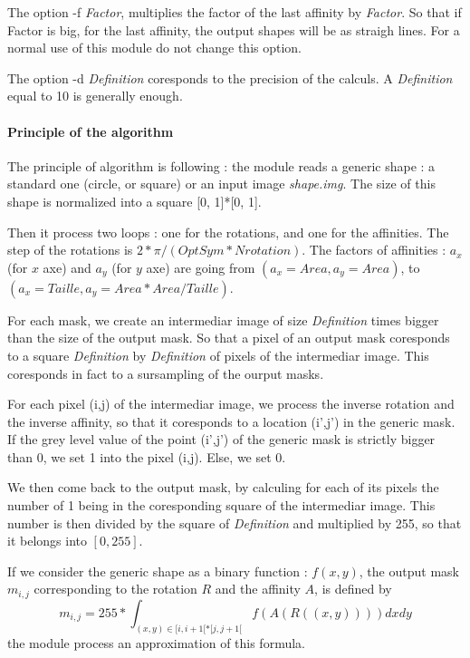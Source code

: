The option -f {\it Factor}, multiplies the factor of the last affinity by {\it Factor}. So that if Factor is big, for the last affinity, the output shapes will be as straigh lines. For a normal use of this module do not change this option.

\vspace{1mm}

The option -d {\it Definition} coresponds to the precision of the calculs.
 A {\it Definition} equal to 10 is generally enough.



\vspace{3mm}

\paragraph{Principle of the algorithm}

The principle of algorithm is following :
the module reads a generic shape : a standard one (circle, or square) or an
input image {\it shape.img}.
The size of this shape is normalized into a square [0, 1]*[0, 1].

Then it process two loops :
one for the rotations, and one for the affinities.
The step of the rotations is $2*\pi/(OptSym*Nrotation)$. The factors of affinities : $a_x$ (for $x$ axe) and $a_y$ (for $y$ axe) are going from
$(a_x = Area, a_y = Area)$, to $(a_x = Taille, a_y= Area*Area/Taille)$.

For each mask, we create an intermediar image of size {\it Definition} times bigger than the size of the output mask.
 So that a pixel of an output mask coresponds to a square {\it Definition} by {\it  Definition} of pixels of the intermediar image. This coresponds in fact to a sursampling of the ourput masks.

For each pixel (i,j) of the intermediar image, we process the inverse rotation and the inverse affinity, so that it coresponds to a location (i',j') in the generic mask.
If the grey level value of the point (i',j') of the generic mask is strictly bigger than 0, we set 1 into the pixel (i,j). Else, we set 0.

We then come back to the output mask, by calculing for each of its pixels the number of 1 being in the coresponding square of the intermediar image. This number is then divided by the square of {\it Definition} and multiplied by 255, so that it belongs into $[0,255]$.

If we consider the generic shape as a binary function : $f(x,y)$, the output mask $m_{i,j}$ corresponding to the rotation $R$ and the affinity $A$, is defined by
$$ m_{i,j}= 255 * \int_{(x,y) \in [i,i+1[*[j,j+1[} f( A( R( (x,y)))) dx dy $$
the module process an approximation of this formula.






